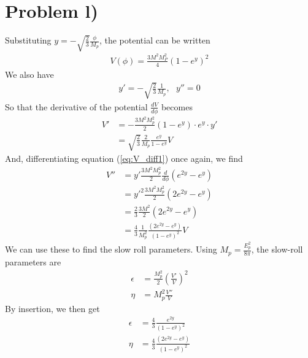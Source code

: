 \documentclass[reprint,english,notitlepage]{revtex4-1}  %
\numberwithin{equation}{section}
\begin{document}
\section{Problem l)} \label{section:problem_l}
Substituting $y=-\sqrt{\frac{2}{3}}\frac{\phi}{M_p}$, the potential can be
written
\begin{align}
	V(\phi) = \frac{3 M^2 M_P^2}{4} \left(1-e^y\right)^2
\end{align}
We also have
\begin{align}
	y' = -\sqrt{\frac{2}{3}}\frac{1}{M_p}, \ \ \ y'' = 0
\end{align}
So that the derivative of the potential $\frac{dV}{d\phi}$ becomes
\begin{align}
	V' &= -\frac{3 M^2 M_p^2}{2}\left(1 - e^y\right) \cdot e^y \cdot y' \label{eq:V_diff1} \\
		 &= \sqrt{\frac{2}{3}} \frac{2}{M_p} \frac{e^y}{1-e^y} V
\end{align}
And, differentiating equation (\ref{eq:V_diff1}) once again, we find
\begin{align}
	V'' &= y' \frac{3M^2 M_p^2}{2} \frac{d}{d\phi}\left( e^{2y} - e^y \right) \\
			&= y'^2 \frac{3M^2 M_p^2}{2}\left( 2e^{2y}- e^y \right) \\
			&= \frac{2}{3}\frac{3M^2}{2}\left( 2e^{2y} - e^y \right) \\
			&= \frac{4}{3}\frac{1}{M_p^2}\frac{\left(2e^{2y} - e^y\right)}{\left( 1 - e^y\right)^2} V
\end{align}
We can use these to find the slow roll parameters. Using $M_p = \frac{E_p^2}{8\pi}$,
the slow-roll parameters are
\begin{align}
	\epsilon &= \frac{M_p^2}{2} \left(\frac{V'}{V}\right)^2 \\
  \eta 		 &= M_p^2 \frac{V''}{V}
\end{align}
By insertion, we then get
\begin{align}
	\epsilon &= \frac{4}{3}\frac{e^{2y}}{\left( 1 - e^y \right)^2} \\
  \eta 		 &= \frac{4}{3} \frac{\left(2e^{2y} - e^y\right)}{\left( 1 - e^y\right)^2}
\end{align}
\end{document}
